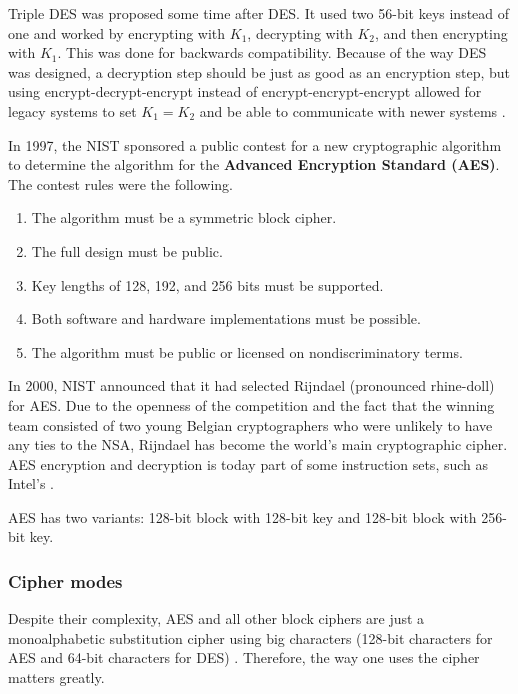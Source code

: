 \documentclass[12pt, oneside]{book}
\begin{document}
Triple DES was proposed some time after DES. It used two 56-bit keys instead of one and worked by encrypting with \(K_1\), decrypting with \(K_2\), and then encrypting with \(K_1\).
This was done for backwards compatibility.
Because of the way DES was designed, a decryption step should be just as good as an encryption step, but using encrypt-decrypt-encrypt instead of encrypt-encrypt-encrypt allowed for legacy systems to set \(K_1 = K_2\) and be able to communicate with newer systems \cite[p.~783]{computer-networks-tanenbaum-2012}.

In 1997, the NIST sponsored a public contest for a new cryptographic algorithm to determine the algorithm for the \textbf{Advanced Encryption Standard (AES)}.
The contest rules were the following.

\begin{enumerate}
\item The algorithm must be a symmetric block cipher.
\item The full design must be public.
\item Key lengths of 128, 192, and 256 bits must be supported.
\item Both software and hardware implementations must be possible.
\item The algorithm must be public or licensed on nondiscriminatory terms.
\end{enumerate}

In 2000, NIST announced that it had selected Rijndael (pronounced rhine-doll) for AES.
Due to the openness of the competition and the fact that the winning team consisted of two young Belgian cryptographers who were unlikely to have any ties to the NSA, Rijndael has become the world's main cryptographic cipher.
AES encryption and decryption is today part of some instruction sets, such as Intel's \cite[p.~784]{computer-networks-tanenbaum-2012}.

AES has two variants: 128-bit block with 128-bit key and 128-bit block with 256-bit key.

\subsubsection{Cipher modes}

Despite their complexity, AES and all other block ciphers are just a monoalphabetic substitution cipher using big characters (128-bit characters for AES and 64-bit characters for DES) \cite[p.~787]{computer-networks-tanenbaum-2012}.
Therefore, the way one uses the cipher matters greatly.
\end{document}
